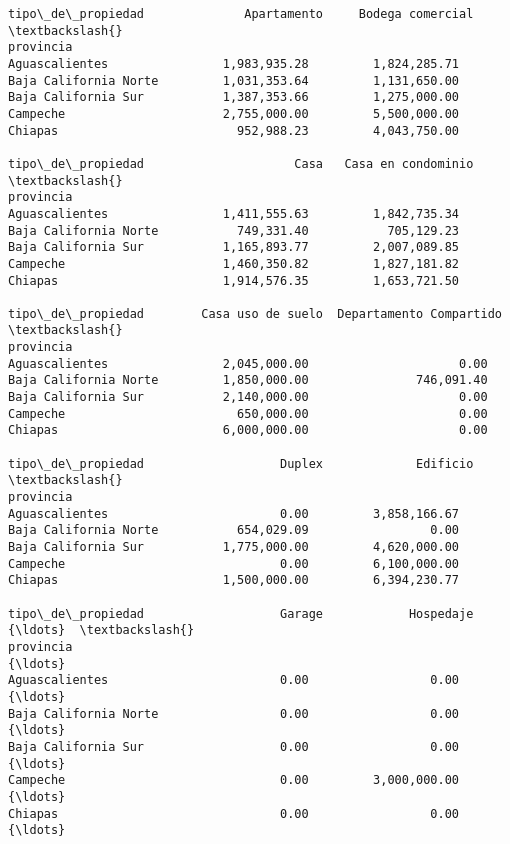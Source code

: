\documentclass[11pt]{article}
\newcommand{\prompt}[4]{
        \llap{{\color{#2}[#3]: #4}}\vspace{-1.25em}
    }
\begin{document}
            \begin{tcolorbox}[breakable, boxrule=.5pt, size=fbox, pad at break*=1mm, opacityfill=0]
\prompt{Out}{outcolor}{85}{\hspace{3.5pt}}
\begin{Verbatim}[commandchars=\\\{\}]
tipo\_de\_propiedad              Apartamento     Bodega comercial  \textbackslash{}
provincia
Aguascalientes                1,983,935.28         1,824,285.71
Baja California Norte         1,031,353.64         1,131,650.00
Baja California Sur           1,387,353.66         1,275,000.00
Campeche                      2,755,000.00         5,500,000.00
Chiapas                         952,988.23         4,043,750.00

tipo\_de\_propiedad                     Casa   Casa en condominio  \textbackslash{}
provincia
Aguascalientes                1,411,555.63         1,842,735.34
Baja California Norte           749,331.40           705,129.23
Baja California Sur           1,165,893.77         2,007,089.85
Campeche                      1,460,350.82         1,827,181.82
Chiapas                       1,914,576.35         1,653,721.50

tipo\_de\_propiedad        Casa uso de suelo  Departamento Compartido  \textbackslash{}
provincia
Aguascalientes                2,045,000.00                     0.00
Baja California Norte         1,850,000.00               746,091.40
Baja California Sur           2,140,000.00                     0.00
Campeche                        650,000.00                     0.00
Chiapas                       6,000,000.00                     0.00

tipo\_de\_propiedad                   Duplex             Edificio  \textbackslash{}
provincia
Aguascalientes                        0.00         3,858,166.67
Baja California Norte           654,029.09                 0.00
Baja California Sur           1,775,000.00         4,620,000.00
Campeche                              0.00         6,100,000.00
Chiapas                       1,500,000.00         6,394,230.77

tipo\_de\_propiedad                   Garage            Hospedaje  {\ldots}  \textbackslash{}
provincia                                                        {\ldots}
Aguascalientes                        0.00                 0.00  {\ldots}
Baja California Norte                 0.00                 0.00  {\ldots}
Baja California Sur                   0.00                 0.00  {\ldots}
Campeche                              0.00         3,000,000.00  {\ldots}
Chiapas                               0.00                 0.00  {\ldots}


\end{Verbatim}
\end{tcolorbox}
\end{document}
